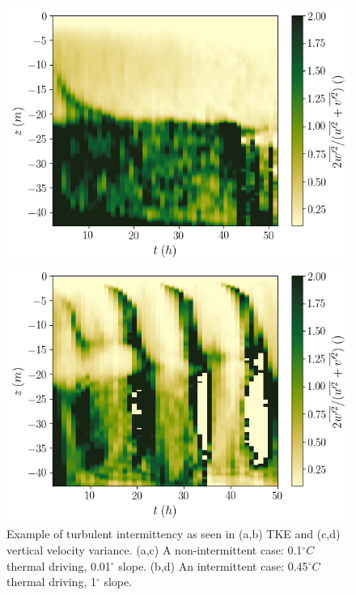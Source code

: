 \documentclass[draft]{agujournal2019}
\begin{document}
\begin{figure}[h!]
\begin{minipage}{0.4\textwidth}
        \includegraphics[trim={0 0cm 3cm 0cm},clip,width=\textwidth]{Figures/dslope2/vel_var_ratio_hovmoller.png}
    \end{minipage}%
    \begin{minipage}{0.5\textwidth}
        \includegraphics[trim={0 0cm 0 0cm},clip,width=\textwidth]{Figures/dT4/vel_var_ratio_hovmoller.png}
    \end{minipage}
    \caption{Example of turbulent intermittency as seen in (a,b) TKE and (c,d) vertical velocity variance. (a,c) A non-intermittent case: 0.1$^{\circ}C$ thermal driving, 0.01$^{\circ}$ slope. (b,d) An intermittent case: 0.45$^{\circ}C$ thermal driving, 1$^{\circ}$ slope.}
    \label{fig:intermittency}
\end{figure}
\end{document}

